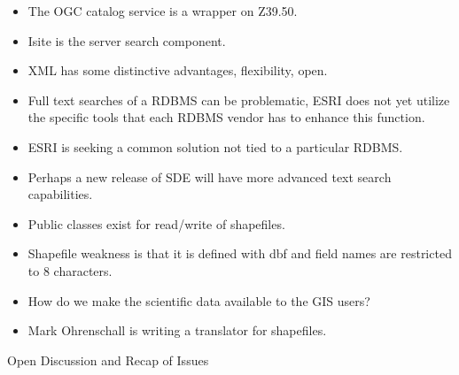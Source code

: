 \begin{itemize}
\item The OGC catalog service is a wrapper on Z39.50.
\item Isite is the server search component.
\item XML has some distinctive advantages, flexibility, open.
\item Full text searches of a RDBMS can be problematic, ESRI does not yet utilize the specific 
tools that each RDBMS vendor has to enhance this function.
\item ESRI is seeking a common solution not tied to a particular RDBMS.
\item Perhaps a new release of SDE will have more advanced text search capabilities.
\item Public classes exist for read/write of shapefiles.
\item Shapefile weakness is that it is defined with dbf and field names are restricted to 8 
characters.
\item How do we make the scientific data available to the GIS users?
\item Mark Ohrenschall is writing a translator for shapefiles.
\end{itemize}


        
Open Discussion and Recap of Issues

